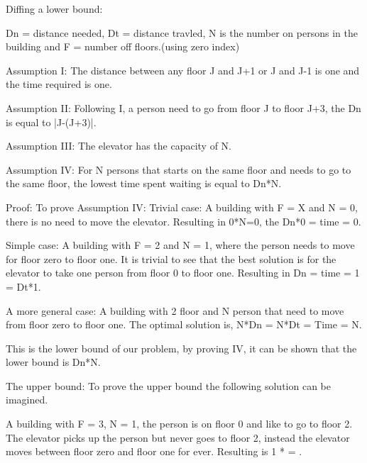 
Diffing a lower bound:

Dn = distance needed, Dt = distance travled, N is the number on persons in the building and F = number off floors.(using zero index)

Assumption I: The distance between any floor J and J+1 or J and J-1 is one and the time required is one.

Assumption II: Following I, a person need to go from floor J to floor J+3, the Dn is equal to |J-(J+3)|.

Assumption III: The elevator has the capacity of N.

Assumption IV: For N persons that starts on the same floor and needs to go to the same floor, the lowest time spent waiting is equal to Dn*N.

Proof:
To prove Assumption IV:
Trivial case: A building with F = X and N = 0, there is no need to move the elevator. Resulting in 0*N=0, the Dn*0 = time = 0.

Simple case: A building with F = 2 and N = 1, where the person needs to move for floor zero to floor one. It is trivial to see that the best solution is for the elevator to take one person from floor 0 to floor one. Resulting in Dn = time = 1 = Dt*1.

A more general case:
A building with 2 floor and N person that need to move from floor zero to floor one. The optimal solution is, N*Dn = N*Dt = Time = N.

This is the lower bound of our problem, by proving IV, it can be shown that the lower bound is Dn*N.

The upper bound:
To prove the upper bound the following solution can be imagined.

A building with F = 3, N = 1, the person is on floor 0 and like to go to floor 2. The elevator picks up the person but never goes to floor 2, instead the elevator moves between floor zero and floor one for ever. Resulting is  1 * \infty  =   \infty.
